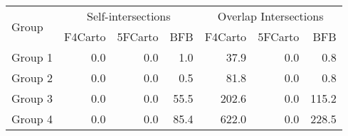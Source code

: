 
\begin{tabular}{lrrr|rrr}
\toprule
\multirow{2}{*}{Group} & \multicolumn{3}{c}{Self-intersections} & \multicolumn{3}{c}{Overlap Intersections} \\
\cmidrule(lr){2-4}\cmidrule(lr){5-7}
                   & F4Carto & 5FCarto & BFB & F4Carto & 5FCarto & BFB \\
\midrule

Group 1 & 0.0 & 0.0 & 1.0 & 37.9 & 0.0 & 0.8 \\
Group 2 & 0.0 & 0.0 & 0.5 & 81.8 & 0.0 & 0.8 \\
Group 3 & 0.0 & 0.0 & 55.5 & 202.6 & 0.0 & 115.2 \\
Group 4 & 0.0 & 0.0 & 85.4 & 622.0 & 0.0 & 228.5 \\
\bottomrule
\end{tabular}
